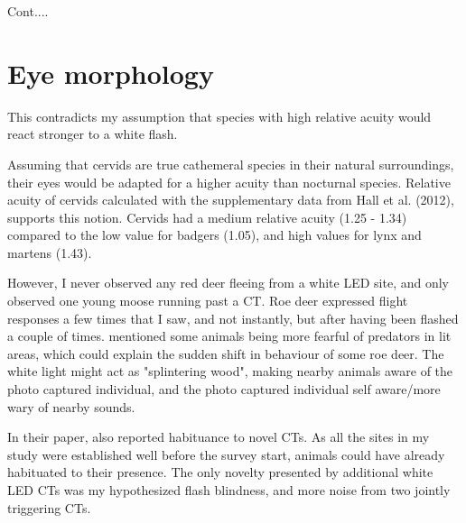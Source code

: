 

Cont....





\section{Eye morphology}

This contradicts my assumption that species with high relative acuity would react stronger to a white flash. %


Assuming that cervids are true cathemeral species in their natural surroundings, their eyes would be adapted for a higher acuity than nocturnal species. Relative acuity of cervids calculated with the supplementary data from Hall et al. (2012), supports this notion. Cervids had a medium relative acuity (1.25 - 1.34) compared to the low value for badgers (1.05), and high values for lynx and martens (1.43).

However, I never observed any red deer fleeing from a white LED site, and only observed one young moose running past a CT.
Roe deer expressed flight responses a few times that I saw, and not instantly, but after having been flashed a couple of times. \textcite{Gaynor2018} mentioned some animals being more fearful of predators in lit areas, which could explain the sudden shift in behaviour of some roe deer. The white light might act as "splintering wood", making nearby animals aware of the photo captured individual, and the photo captured individual self aware/more wary of nearby sounds.




In their paper, \textcite{Henrich2020} also reported habituance to novel CTs.
As all the sites in my study were established well before the survey start, animals could have already habituated to their presence. The only novelty presented by additional white LED CTs was my hypothesized flash blindness, and more noise from two jointly triggering CTs.

